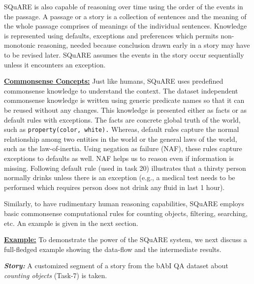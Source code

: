 \documentclass[letterpaper]{article}
\begin{document}
SQuARE is also capable of reasoning over time using the order of the events in the passage. A passage or a story is a collection of sentences and the meaning of the whole passage comprises of meanings of the individual sentences. Knowledge is represented using defaults, exceptions and preferences which permits non-monotonic reasoning, needed because conclusion drawn early in a story may have to be revised later. SQuARE assumes the events in the story occur sequentially unless it encounters an exception.

\medskip
\noindent\textbf{\underline{Commonsense Concepts:}}
Just like humans, SQuARE uses predefined commonsense knowledge to understand the context. The dataset independent commonsense knowledge is written using generic predicate names so that it can be reused without any changes. This knowledge is presented either as facts or as default rules with exceptions. The facts are concrete global truth of the world, such as \texttt{property(color, white).} Whereas, default rules capture the normal relationship among two entities in the world or the general laws of the world, such as the law-of-inertia. Using negation as failure (NAF), these rules capture exceptions to defaults as well. NAF helps us to reason even if information is missing. Following default rule (used in task 20) illustrates that a thirsty person normally drinks unless there is an exception (e.g., a medical test needs to be performed which requires person does not drink any fluid in last 1 hour).

\smallskip
\noindent
\cprotect {}

\smallskip\noindent
Similarly, to have rudimentary human reasoning capabilities, SQuARE employs basic commonsense computational rules for counting objects, filtering, searching, etc. An example is given in the next section.

\noindent\textbf{\underline{Example:}}
To demonstrate the power of the SQuARE system, we next discuss a full-fledged example showing the data-flow and the intermediate results.

\noindent \textit{\textbf{Story:} } A customized segment of a story from the bAbI QA dataset about \textit{counting objects} (Task-7) is taken.
\end{document}
